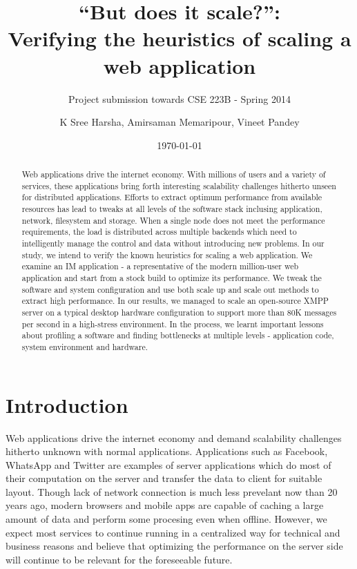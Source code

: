 \documentclass[a4paper, twocolumn]{article}
\title{“But does it scale?”: \\Verifying the heuristics of scaling a web application}
\subtitle{Project submission towards CSE 223B - Spring 2014}
\author{K Sree Harsha, Amirsaman Memaripour, Vineet Pandey}
\date{\today}
\begin{document}
\maketitle

\begin{abstract}
Web applications drive the internet economy. With millions of users and a variety of services, these applications bring forth interesting scalability challenges hitherto unseen for distributed applications. Efforts to extract optimum performance from available resources has lead to tweaks at all levels of the software stack inclusing application, network, filesystem and storage. When a single node does not meet the performance requirements, the load is distributed across multiple backends which need to intelligently manage the control and data without introducing new problems. In our study, we intend to verify the known heuristics for scaling a web application. We examine an IM application - a representative of the modern million-user web application and start from a stock build to optimize its performance. We tweak the software and system configuration and use both scale up and scale out methods to extract high performance. In our results, we managed to scale an open-source  XMPP server on a typical desktop hardware configuration to support more than 80K messages per second in a high-stress environment. In the process, we learnt important lessons about profiling a software and finding bottlenecks at multiple levels - application code, system environment and hardware. 
\end{abstract}

\section{Introduction}
Web applications drive the internet economy and demand scalability challenges hitherto unknown with normal applications. Applications such as Facebook, WhatsApp and Twitter are examples of server applications which do most of their computation on the server and transfer the data to client for suitable layout. Though lack of network connection is much less prevelant now than 20 years ago, modern browsers and mobile apps are capable of caching a large amount of data and perform some procesing even when offline. However, we expect most services to continue running in a centralized way for technical and business reasons and believe that optimizing the performance on the server side will continue to be relevant for the foreseeable future. 
\end{document}
